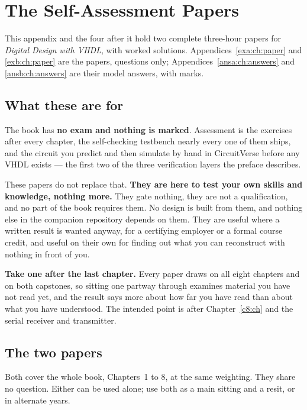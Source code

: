 
\chapter{The Self-Assessment Papers}
\label{exam:ch:about}

This appendix and the four after it hold two complete three-hour papers for \emph{Digital Design
with VHDL}, with worked solutions. Appendices~\ref{exa:ch:paper} and \ref{exb:ch:paper} are the
papers, questions only; Appendices~\ref{ansa:ch:answers} and \ref{ansb:ch:answers} are their model
answers, with marks.

\section*{What these are for}
The book has \textbf{no exam and nothing is marked}. Assessment is the exercises after every
chapter, the self-checking testbench nearly every one of them ships, and the circuit you predict and
then simulate by hand in CircuitVerse before any VHDL exists --- the first two of the three
verification layers the preface describes.

These papers do not replace that. \textbf{They are here to test your own skills and knowledge,
nothing more.} They gate nothing, they are not a qualification, and no part of the book requires
them. No design is built from them, and nothing else in the companion repository depends on them.
They are useful where a written result is wanted anyway, for a certifying employer or a formal
course credit, and useful on their own for finding out what you can reconstruct with nothing in
front of you.

\textbf{Take one after the last chapter.} Every paper draws on all eight chapters and on both
capstones, so sitting one partway through examines material you have not read yet, and the result
says more about how far you have read than about what you have understood. The intended point is
after Chapter~\ref{c8:ch} and the serial receiver and transmitter.

\section*{The two papers}
Both cover the whole book, Chapters~1 to 8, at the same weighting. They share no question. Either
can be used alone; use both as a main sitting and a resit, or in alternate years.

